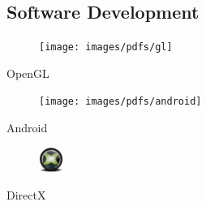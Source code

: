 \begin{aside}
    \subsection{Software Development}
      \begin{center}
        \vspace{2mm}%
        \begin{minipage}[t]{12mm}
          \vspace{-6mm}
          \begin{center}
            \begin{figure}
              \texttt{[image: images/pdfs/gl]}
            \end{figure}
            \vspace{2.60mm}
            \small{OpenGL}
          \end{center}
        \end{minipage}\hspace{0.5mm}%
        \vspace{2mm}%
        \begin{minipage}[t]{12mm}
          \begin{center}
            \begin{figure}
              \texttt{[image: images/pdfs/android]}
            \end{figure}
            \small{Android}
          \end{center}
        \end{minipage}\hspace{0.5mm}%
        \begin{minipage}[t]{12mm}
          \begin{center}
            \begin{figure}
              \includegraphics[width=8mm]{images/directx}
            \end{figure}
            \small{DirectX}
          \end{center}
        \end{minipage}\hspace{0.5mm}%
      \end{center}


\end{aside}
